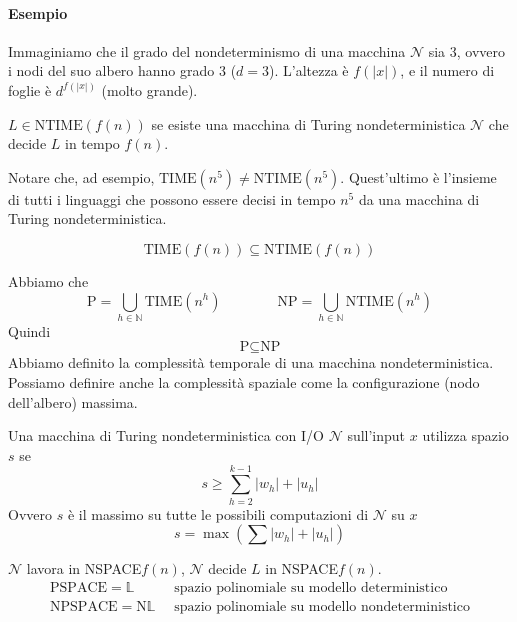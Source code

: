 \paragraph{Esempio} Immaginiamo che il grado del nondeterminismo di una macchina $\mathcal{N}$ sia 3, ovvero i nodi del suo albero hanno grado 3 ($d=3$). L'altezza è $f(|x|)$, e il numero di foglie è $d^{f(|x|)}$ (molto grande).


\begin{definition}
    $L\in\text{NTIME}(f(n))$ se esiste una macchina di Turing nondeterministica $\mathcal{N}$ che decide $L$ in tempo $f(n)$.
\end{definition}
Notare che, ad esempio, $\text{TIME}(n^5)\neq\text{NTIME}(n^5)$. Quest'ultimo è l'insieme di tutti i linguaggi che possono essere decisi in tempo $n^5$ da una macchina di Turing nondeterministica.

\begin{proposition}
    $$
        \text{TIME}(f(n)) \subseteq \text{NTIME}(f(n))
    $$
\end{proposition}
Abbiamo che
$$
    \text{P} = \bigcup_{h\in\mathbb{N}} \text{TIME}(n^h)
    \qquad \qquad 
    \text{NP} = \bigcup_{h\in\mathbb{N}} \text{NTIME}(n^h)
$$
Quindi
$$
    \text{P} \subseteq \text{NP}
$$
Abbiamo definito la complessità temporale di una macchina nondeterministica. Possiamo definire anche la complessità spaziale come la configurazione (nodo dell'albero) massima.
\begin{definition}
    Una macchina di Turing nondeterministica con I/O $\mathcal{N}$ sull'input $x$ utilizza spazio $s$ se 
    $$
        s \geq \sum_{h=2}^{k-1} |w_h| + |u_h|
    $$
    Ovvero $s$ è il massimo su tutte le possibili computazioni di $\mathcal{N}$ su $x$
    $$
        s = \max\left( \sum |w_h| + |u_h| \right)
    $$
\end{definition}
$\mathcal{N}$ lavora in NSPACE$f(n)$, $\mathcal{N}$ decide $L$ in NSPACE$f(n)$.
\begin{align*}
    \text{PSPACE}=\mathbb{L} & ~\text{ spazio polinomiale su modello deterministico}\\
    \text{NPSPACE}=\text{N}\mathbb{L} & ~\text{ spazio polinomiale su modello nondeterministico} 
\end{align*}


